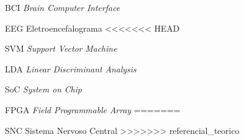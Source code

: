 \begin{siglas}
  \item[BCI] \textit{Brain Computer Interface}
  \item[EEG] Eletroencefalograma
<<<<<<< HEAD
  \item[SVM] \textit{Support Vector Machine}
  \item[LDA] \textit{Linear Discriminant Analysis}
  \item[SoC] \textit{System on Chip}
  \item[FPGA] \textit{Field Programmable Array}
=======
  \item[SNC] Sistema Nervoso Central
>>>>>>> referencial_teorico
  
\end{siglas}
